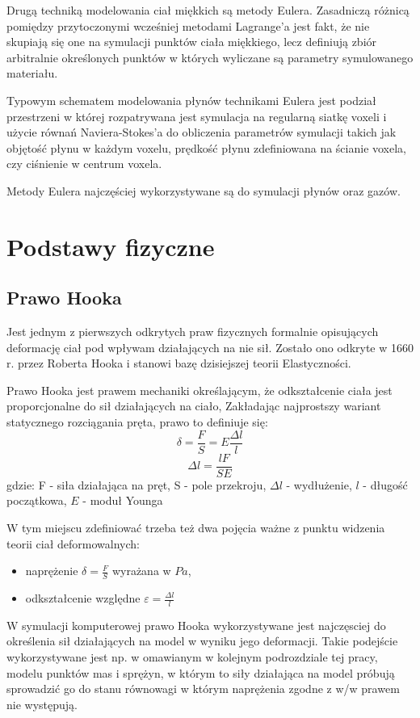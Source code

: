 Drugą techniką modelowania ciał miękkich są metody Eulera. Zasadniczą różnicą
pomiędzy przytoczonymi wcześniej metodami Lagrange'a jest fakt, że nie skupiają 
się one na symulacji punktów ciała miękkiego, lecz definiują zbiór arbitralnie
określonych punktów w których wyliczane są parametry symulowanego materiału.

Typowym schematem modelowania płynów technikami Eulera jest podział przestrzeni w
której rozpatrywana jest symulacja na regularną siatkę voxeli i użycie równań Naviera-Stokes'a do
obliczenia parametrów symulacji takich jak objętość płynu w każdym voxelu,
 prędkość płynu zdefiniowana na ścianie voxela, czy ciśnienie w centrum voxela.

Metody Eulera najczęściej wykorzystywane są do symulacji płynów oraz gazów.

\section{Podstawy fizyczne}
\subsection{Prawo Hooka}
Jest jednym z pierwszych odkrytych praw fizycznych formalnie opisujących deformację ciał pod wpływam
działających na nie sił. Zostało ono odkryte w 1660 r. przez Roberta Hooka i 
stanowi bazę dzisiejszej teorii Elastyczności\cite{elast}.

Prawo Hooka jest prawem mechaniki określającym, że odkształcenie ciała jest
proporcjonalne do sił działających na ciało,
Zakładając najprostszy wariant statycznego rozciągania pręta, prawo to definiuje
się:
$$\delta = \frac{F}{S} = E\frac{\Delta l}{l}$$
$$\Delta l = \frac{lF}{SE}$$
gdzie:
F - siła działająca na pręt,
S - pole przekroju,
$\Delta l$ - wydłużenie,
$l$ - długość początkowa,
$E$ - moduł Younga

W tym miejscu zdefiniować trzeba też dwa pojęcia ważne z punktu widzenia teorii
ciał deformowalnych:
\begin{itemize}
\item naprężenie $\delta = \frac{F}{S}$ wyrażana w $Pa$,
\item odkształcenie względne $\varepsilon = \frac{\Delta l}{l}$
\end{itemize}
 
W symulacji komputerowej prawo Hooka wykorzystywane jest najczęsciej do określenia sił
działających na model w wyniku jego deformacji. Takie podejście wykorzystywane
jest np. w omawianym w kolejnym podrozdziale tej pracy, modelu punktów mas i
sprężyn, w którym to siły działająca na model próbują sprowadzić go do stanu
równowagi w którym naprężenia zgodne z w/w prawem nie występują.

